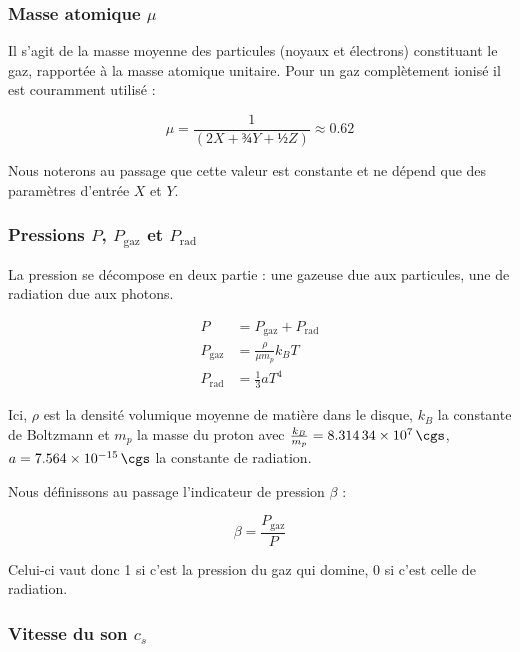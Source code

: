 \subsubsection{Masse atomique $\mu$}

Il s’agit de la masse moyenne des particules (noyaux et électrons) constituant
le gaz, rapportée à la masse atomique unitaire. Pour un gaz complètement ionisé
il est couramment utilisé :

\begin{equation}
    \label{eq:masse_atomique}
    \mu = \frac{1}{\left(2X + ¾Y + ½Z\right)} \approx 0.62
\end{equation}

Nous noterons au passage que cette valeur est constante et ne dépend que des
paramètres d’entrée $X$ et $Y$.

\subsubsection{Pressions $P$, $P_\mathrm{gaz}$ et $P_\mathrm{rad}$}

La pression se décompose en deux partie : une gazeuse due aux particules, une de radiation due aux photons.

\begin{align}
    \label{eq:pression}
    P &= P_{\mathrm{gaz}} + P_{\mathrm{rad}} \\
    P_{\mathrm{gaz}} &= \frac{\rho}{\mu m_p} k_B T \\
    P_{\mathrm{rad}} &= \frac{1}{3} a T^4
\end{align}

Ici, $\rho$ est la densité volumique moyenne de matière dans le disque, $k_B$
la constante de Boltzmann et $m_p$ la masse du proton avec $\frac{k_B}{m_p} =
\SI{8.31434e7}{\cgs}$, $a = \SI{7.564e-15}{\cgs}$ la constante de radiation.

Nous définissons au passage l’indicateur de pression $\beta$ :

\begin{equation}
    \label{eq:beta}
    \beta = \frac{P_{\mathrm{gaz}}}{P}
\end{equation}

Celui-ci vaut donc 1 si c’est la pression du gaz qui domine, 0 si c’est celle de radiation.

\subsubsection{Vitesse du son $c_s$}

